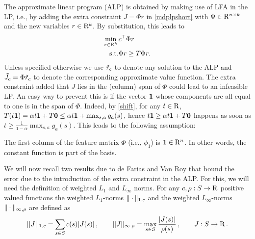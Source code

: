 The approximate linear program (ALP) is obtained by making use of LFA in the LP, i.e., by adding the extra constraint $J=\Phi r$ in \eqref{mdplpshort} with $\Phi \in \mathrm{R}^{n\times k}$ and the new variables $r\in \mathrm{R}^k$. 
By substitution, this leads to
\begin{align}\label{alp}
\begin{split}
\min_{r\in \R^k}\, &c^\top \Phi r\\
\text{s.t.}\mb &\Phi r\geq T \Phi r.
\end{split}
\end{align}
Unless specified otherwise we use $\tilde{r}_c$ to denote any solution to the ALP and $\tilde{J}_c=\Phi \tilde{r}_c$ to denote the corresponding approximate value function. 
The extra constraint added that $J$ lies in the (column) span of $\Phi$ could lead to an infeasible LP. An easy way to prevent this is if the vector $\mathbf{1}$ whose components are all equal to one is in the span of $\Phi$.
Indeed, by \cref{shift}, for any $t\in \mathrm{R}$, $T (t\mathbf{1} ) =  \alpha t \mathbf{1}+T \mathbf{0} \le \alpha t \mathbf{1} + \max_{s,a} g_a(s)$, hence $t\mathbf{1} \ge \alpha t \mathbf{1}+T\mathbf{0} $ happens as soon as
$t\ge \frac{1}{1-\alpha}\max_{s,a} g_a(s)$. 
This leads to the following assumption:
\begin{assumption}\label{one}
The first column of the feature matrix $\Phi$ (i.e., $\phi_1$) is $\mathbf{1} \in \mathrm{R}^n$. 
In other words, the constant function is part of the basis.
\end{assumption}

We will now recall two results due to de Farias and Van Roy 
	that bound the error due to the introduction of the extra constraint in the ALP.
For this, we will need the definition of weighted $L_1$ and $L_\infty$ norms.
For any $c,\rho:S \to \mathrm{R}$ positive valued functions
the weighted $L_1$-norms $\|\cdot\|_{1,c}$ 
and 
the weighted $L_\infty$-norms  $\|\cdot\|_{\infty,\rho}$ are defined as
\begin{align*}
||J||_{1,c}=\sum_{s \in S} c(s)|J(s)|\,, \qquad
||J||_{\infty,\rho}=\max_{s \in S} \frac{|J(s)|}{\rho(s)}\,, \qquad J:S\to \mathrm{R}\,.
\end{align*}

